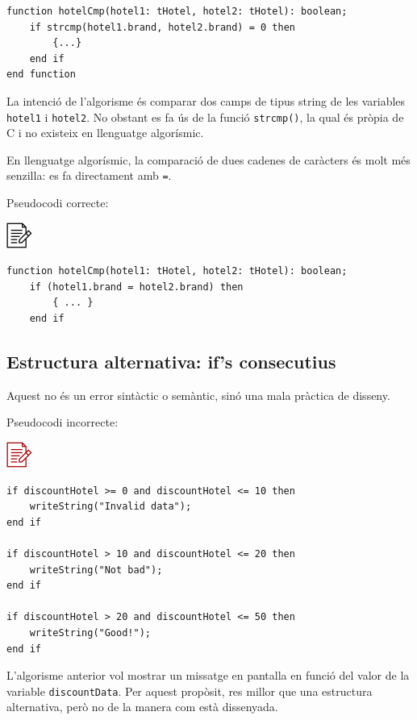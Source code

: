 \documentclass[
]{book}
\begin{document}
\begin{verbatim}
function hotelCmp(hotel1: tHotel, hotel2: tHotel): boolean;
    if strcmp(hotel1.brand, hotel2.brand) = 0 then
        {...}
    end if
end function
\end{verbatim}

La intenció de l'algorisme és comparar dos camps de tipus string de les variables \texttt{hotel1} i \texttt{hotel2}. No obstant es fa ús de la funció \texttt{strcmp()}, la qual és pròpia de C i no existeix en llenguatge algorísmic.

En llenguatge algorísmic, la comparació de dues cadenes de caràcters és molt més senzilla: es fa directament amb \texttt{=}.

Pseudocodi correcte:

\includegraphics{./img/alg.png}

\begin{verbatim}
function hotelCmp(hotel1: tHotel, hotel2: tHotel): boolean;
    if (hotel1.brand = hotel2.brand) then
        { ... }
    end if
\end{verbatim}

\hypertarget{estructura-alternativa-ifs-consecutius}{%
\subsection{Estructura alternativa: if's consecutius}\label{estructura-alternativa-ifs-consecutius}}

Aquest no és un error sintàctic o semàntic, sinó una mala pràctica de disseny.

Pseudocodi incorrecte:

\includegraphics{./img/alg_err.png}

\begin{verbatim}
if discountHotel >= 0 and discountHotel <= 10 then
    writeString("Invalid data");
end if

if discountHotel > 10 and discountHotel <= 20 then
    writeString("Not bad");
end if

if discountHotel > 20 and discountHotel <= 50 then
    writeString("Good!");
end if
\end{verbatim}

L'algorisme anterior vol mostrar un missatge en pantalla en funció del valor de la variable \texttt{discountData}. Per aquest propòsit, res millor que una estructura alternativa, però no de la manera com està dissenyada.
\end{document}
